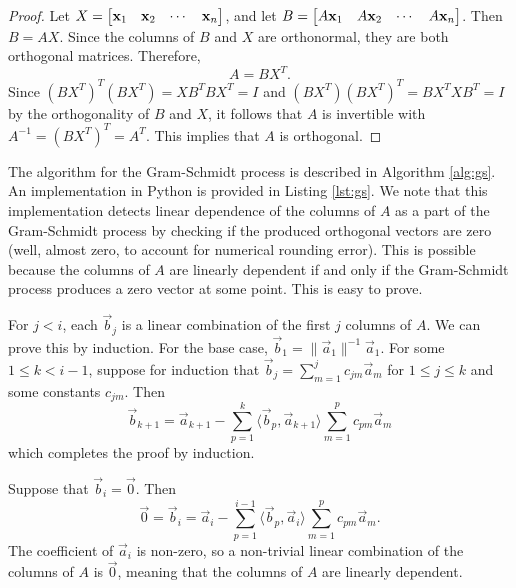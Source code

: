 \documentclass{homework}
\begin{document}
	\begin{proof}
		Let $X = \left[\begin{matrix}\mathbf{x}_1 & \mathbf{x}_2 & \cdots & \mathbf{x}_n\end{matrix}\right]$, and let $B = \left[\begin{matrix}A\mathbf{x}_1 & A\mathbf{x}_2 & \cdots & A\mathbf{x}_n\end{matrix}\right]$. Then $B = AX$. Since the columns of $B$ and $X$ are orthonormal, they are both orthogonal matrices. Therefore,
		\begin{equation*}
			A = BX^T.
		\end{equation*}
		Since $(BX^T)^T(BX^T) = XB^TBX^T = I$ and $(BX^T)(BX^T)^T = BX^TXB^T = I$ by the orthogonality of $B$ and $X$, it follows that $A$ is invertible with $A^{-1} = (BX^T)^T = A^T$. This implies that $A$ is orthogonal.
	\end{proof}
	
	\question The algorithm for the Gram-Schmidt process is described in Algorithm \ref{alg:gs}. An implementation in Python is provided in Listing \ref{lst:gs}. We note that this implementation detects linear dependence of the columns of $A$ as a part of the Gram-Schmidt process by checking if the produced orthogonal vectors are zero (well, almost zero, to account for numerical rounding error). This is possible because the columns of $A$ are linearly dependent if and only if the Gram-Schmidt process produces a zero vector at some point. This is easy to prove.
	
	For $j < i$, each $\vec{b}_j$ is a linear combination of the first $j$ columns of $A$. We can prove this by induction. For the base case, $\vec{b}_1 = \lVert\vec{a}_1\rVert^{-1}\vec{a}_1$. For some $1 \le k < i-1$, suppose for induction that $\vec{b}_j = \sum\limits_{m=1}^jc_{jm}\vec{a}_m$ for $1 \le j \le k$ and some constants $c_{jm}$. Then
	\begin{equation*}
		\vec{b}_{k+1} = \vec{a}_{k+1} - \sum_{p=1}^k \langle\vec{b}_p,\vec{a}_{k+1}\rangle \sum_{m=1}^p c_{pm}\vec{a}_m
	\end{equation*}
	which completes the proof by induction.
	
	Suppose that $\vec{b}_i = \vec{0}$. Then
	\begin{equation*}
		\vec{0} = \vec{b}_i = \vec{a}_i - \sum_{p=1}^{i-1}\langle\vec{b}_p, \vec{a}_i\rangle \sum_{m=1}^pc_{pm}\vec{a}_m.
	\end{equation*}
	The coefficient of $\vec{a}_i$ is non-zero, so a non-trivial linear combination of the columns of $A$ is $\vec{0}$, meaning that the columns of $A$ are linearly dependent.
	
\end{document}
